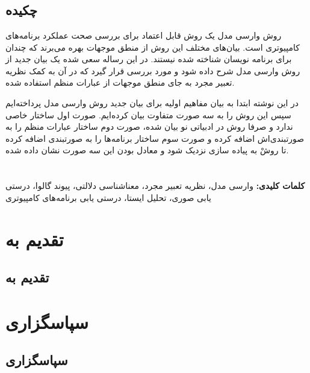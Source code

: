 \documentclass[12pt]{report}
\begin{document}
\newpage
\pagestyle{plain}
\setcounter{page}{1}
\chapter*{}
\section*{چکیده}
روش وارسی مدل یک روش قابل اعتماد برای بررسی صحت عملکرد برنامه‌های کامپیوتری است. بیان‌های مختلف این روش از منطق موجهات بهره می‌برند که چندان برای برنامه نویسان شناخته شده نیستند. در این رساله سعی شده یک بیان جدید از روش وارسی مدل شرح داده شود و مورد بررسی قرار گیرد که در آن به کمک نظریه تعبیر مجرد به جای منطق موجهات از عبارات منظم استفاده شده.

در این نوشته ابتدا به بیان مفاهیم اولیه‌ برای بیان جدید روش وارسی مدل پرداخته‌ایم سپس این روش را به سه صورت متفاوت بیان کرده‌ایم. صورت اول ساختار خاصی ندارد و صرفا روش در ادبیاتی نو بیان شده، صورت دوم ساختار عبارات منظم را به صورتبندی‌اش اضافه کرده و صورت سوم ساختار برنامه‌ها را به صورتبندی اضافه کرده تا روشْ به پیاده سازی نزدیک شود و معادل بودن این سه صورت نشان داده شده.\\\\\\


\textbf{کلمات کلیدی:}
وارسی مدل، نظریه تعبیر مجرد، معناشناسی دلالتی، پیوند گالوا، درستی یابی صوری، تحلیل ایستا، درستی یابی برنامه‌های کامپیوتری
\chapter*{تقدیم به}
\section*{تقدیم به}

\chapter*{سپاسگزاری}
\section*{سپاسگزاری}
\end{document}
